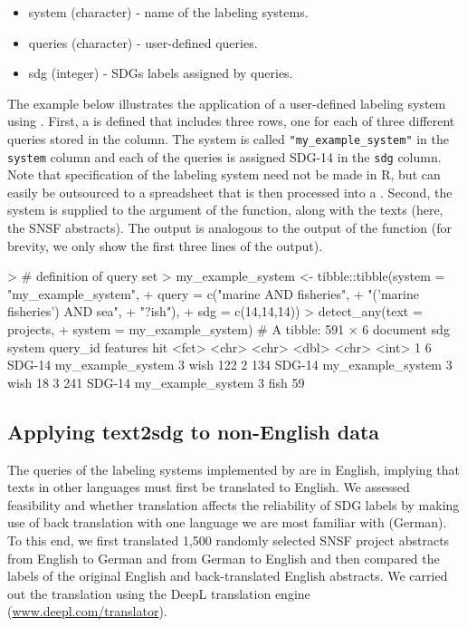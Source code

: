 \begin{itemize}
  \item system (character) - name of the labeling systems.
  \item queries (character) - user-defined queries.
  \item sdg (integer) - SDGs labels assigned by queries.
\end{itemize}

 The example below illustrates the application of a user-defined labeling system using . First, a  is defined that includes three rows, one for each of three different queries stored in the  column. The system is called \texttt{"my\_example\_system"} in the \texttt{system} column and each of the queries is assigned SDG-14 in the \texttt{sdg} column. Note that specification of the labeling system need not be made in R, but can easily be outsourced to a spreadsheet that is then processed into a . Second, the system is supplied to the  argument of the  function, along with the texts (here, the SNSF abstracts). The output is analogous to the output of the  function (for brevity, we only show the first three lines of the output). 
 
 
\begin{example}
> # definition of query set
> my_example_system <- tibble::tibble(system = "my_example_system",
+                             query = c("marine AND fisheries", 
+                                        "('marine fisheries') AND sea", 
+                                        "?ish"),
+                             sdg = c(14,14,14))
> detect_any(text = projects, 
+            system = my_example_system)
# A tibble: 591 × 6
   document sdg    system            query_id features   hit
   <fct>    <chr>  <chr>                <dbl> <chr>    <int>
 1 6        SDG-14 my_example_system        3 wish       122
 2 134      SDG-14 my_example_system        3 wish        18
 3 241      SDG-14 my_example_system        3 fish        59

\end{example}


\subsection{Applying text2sdg to non-English data}
The queries of the labeling systems implemented by  are in English, implying that texts in other languages must first be translated to English. We assessed feasibility and whether translation affects the reliability of SDG labels by making use of back translation with one language we are most familiar with (German). To this end, we first translated 1,500 randomly selected SNSF project abstracts from English to German and from German to English and then compared the labels of the original English and back-translated English abstracts. We carried out the translation using the DeepL translation engine (\href{https://www.deepl.com/translator}{www.deepl.com/translator}). 

